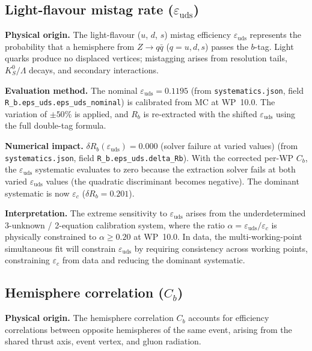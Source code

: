 \documentclass[11pt,a4paper]{article}
\begin{document}
\subsection{Light-flavour mistag rate ($\varepsilon_\mathrm{uds}$)}
\label{sec:syst_eps_uds}

\textbf{Physical origin.} The light-flavour ($u$, $d$, $s$) mistag efficiency
$\varepsilon_\mathrm{uds}$ represents the probability that a hemisphere from
$Z \to q\bar{q}$ ($q = u, d, s$) passes the $b$-tag. Light quarks produce no
displaced vertices; mistagging arises from resolution tails, $K_S^0/\Lambda$
decays, and secondary interactions.

\textbf{Evaluation method.} The nominal $\varepsilon_\mathrm{uds} = 0.1195$
(from \texttt{systematics.json}, field \texttt{R\_b.eps\_uds.eps\_uds\_nominal})
is calibrated from MC at WP~10.0. The variation of $\pm 50\%$ is applied, and
$R_b$ is re-extracted with the shifted $\varepsilon_\mathrm{uds}$ using the
full double-tag formula.

\textbf{Numerical impact.}
$\delta R_b(\varepsilon_\mathrm{uds}) = 0.000$ (solver failure at varied values)
(from \texttt{systematics.json}, field \texttt{R\_b.eps\_uds.delta\_Rb}).
With the corrected per-WP $C_b$, the $\varepsilon_\mathrm{uds}$ systematic evaluates to zero
because the extraction solver fails at both varied $\varepsilon_\mathrm{uds}$ values (the
quadratic discriminant becomes negative). The dominant systematic is now $\varepsilon_c$
($\delta R_b = 0.201$).

\textbf{Interpretation.} The extreme sensitivity to $\varepsilon_\mathrm{uds}$ arises
from the underdetermined 3-unknown / 2-equation calibration system, where the ratio
$\alpha = \varepsilon_\mathrm{uds}/\varepsilon_c$ is physically constrained to
$\alpha \geq 0.20$ at WP~10.0. In data, the multi-working-point simultaneous fit
will constrain $\varepsilon_\mathrm{uds}$ by requiring consistency across working
points, constraining $\varepsilon_c$ from data and reducing the dominant systematic.

\subsection{Hemisphere correlation ($C_b$)}
\label{sec:syst_cb}

\textbf{Physical origin.} The hemisphere correlation $C_b$ accounts for efficiency
correlations between opposite hemispheres of the same event, arising from the shared
thrust axis, event vertex, and gluon radiation.
\end{document}
